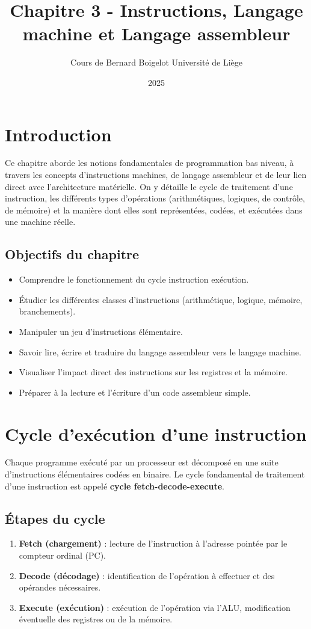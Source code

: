 \documentclass[12pt,a4paper]{article}
\title{\Huge\textbf{Chapitre 3 - Instructions, Langage machine et Langage assembleur}}
\author{Cours de Bernard Boigelot \newline Université de Liège}
\date{2025}
\begin{document}
\maketitle

\tableofcontents

\newpage

\section{Introduction}
Ce chapitre aborde les notions fondamentales de programmation bas niveau, à travers les concepts d'instructions machines, de langage assembleur et de leur lien direct avec l'architecture matérielle. On y détaille le cycle de traitement d'une instruction, les différents types d'opérations (arithmétiques, logiques, de contrôle, de mémoire) et la manière dont elles sont représentées, codées, et exécutées dans une machine réelle.

\subsection*{Objectifs du chapitre}
\begin{itemize}
  \item Comprendre le fonctionnement du cycle instruction exécution.
  \item Étudier les différentes classes d’instructions (arithmétique, logique, mémoire, branchements).
  \item Manipuler un jeu d'instructions élémentaire.
  \item Savoir lire, écrire et traduire du langage assembleur vers le langage machine.
  \item Visualiser l’impact direct des instructions sur les registres et la mémoire.
  \item Préparer à la lecture et l’écriture d’un code assembleur simple.
\end{itemize}

\section{Cycle d'exécution d'une instruction}

Chaque programme exécuté par un processeur est décomposé en une suite d’instructions élémentaires codées en binaire. Le cycle fondamental de traitement d’une instruction est appelé \textbf{cycle fetch-decode-execute}.

\subsection{Étapes du cycle}
\begin{enumerate}
  \item \textbf{Fetch (chargement)} : lecture de l'instruction à l'adresse pointée par le compteur ordinal (PC).
  \item \textbf{Decode (décodage)} : identification de l’opération à effectuer et des opérandes nécessaires.
  \item \textbf{Execute (exécution)} : exécution de l’opération via l’ALU, modification éventuelle des registres ou de la mémoire.
\end{enumerate}
\end{document}
